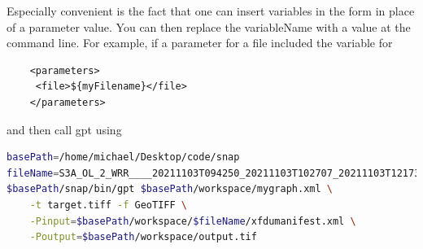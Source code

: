 Especially convenient is the fact that one can  insert variables in the form  in place
of a parameter value. You can then replace the variableName with a value at the command line.
For example, if a parameter for a file included the variable for 
\begin{lstlisting}
    <parameters>
     <file>${myFilename}</file>
    </parameters>
\end{lstlisting}
and then call gpt using 
\begin{lstlisting}[language=bash]
basePath=/home/michael/Desktop/code/snap
fileName=S3A_OL_2_WRR____20211103T094250_20211103T102707_20211103T121733_2657_078_136______MAR_O_NR_003.SEN3
$basePath/snap/bin/gpt $basePath/workspace/mygraph.xml \
    -t target.tiff -f GeoTIFF \
    -Pinput=$basePath/workspace/$fileName/xfdumanifest.xml \
    -Poutput=$basePath/workspace/output.tif
\end{lstlisting}


